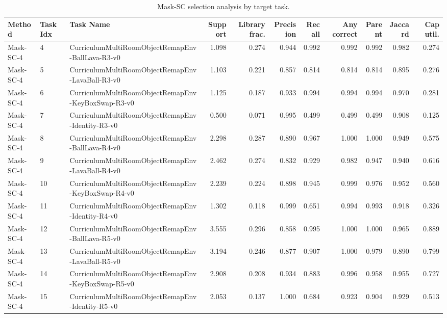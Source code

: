 \begin{table}[ht]
    \caption{Mask-SC selection analysis by target task.}
    \label{tbl:masksc_selection_task}
    \centering
    \scriptsize
    \begin{tabular}{lllrrrrrrrr}
    \toprule
Method & Task Idx & Task Name & Support & Library frac. & Precision & Recall & Any correct & Parent & Jaccard & Cap util. \\
    \midrule
Mask-SC-4 & 4 & CurriculumMultiRoomObjectRemapEnv-BallLava-R3-v0 & 1.098 & 0.274 & 0.944 & 0.992 & 0.992 & 0.992 & 0.982 & 0.274 \\
Mask-SC-4 & 5 & CurriculumMultiRoomObjectRemapEnv-LavaBall-R3-v0 & 1.103 & 0.221 & 0.857 & 0.814 & 0.814 & 0.814 & 0.895 & 0.276 \\
Mask-SC-4 & 6 & CurriculumMultiRoomObjectRemapEnv-KeyBoxSwap-R3-v0 & 1.125 & 0.187 & 0.933 & 0.994 & 0.994 & 0.994 & 0.970 & 0.281 \\
Mask-SC-4 & 7 & CurriculumMultiRoomObjectRemapEnv-Identity-R3-v0 & 0.500 & 0.071 & 0.995 & 0.499 & 0.499 & 0.499 & 0.908 & 0.125 \\
Mask-SC-4 & 8 & CurriculumMultiRoomObjectRemapEnv-BallLava-R4-v0 & 2.298 & 0.287 & 0.890 & 0.967 & 1.000 & 1.000 & 0.949 & 0.575 \\
Mask-SC-4 & 9 & CurriculumMultiRoomObjectRemapEnv-LavaBall-R4-v0 & 2.462 & 0.274 & 0.832 & 0.929 & 0.982 & 0.947 & 0.940 & 0.616 \\
Mask-SC-4 & 10 & CurriculumMultiRoomObjectRemapEnv-KeyBoxSwap-R4-v0 & 2.239 & 0.224 & 0.898 & 0.945 & 0.999 & 0.976 & 0.952 & 0.560 \\
Mask-SC-4 & 11 & CurriculumMultiRoomObjectRemapEnv-Identity-R4-v0 & 1.302 & 0.118 & 0.999 & 0.651 & 0.994 & 0.993 & 0.918 & 0.326 \\
Mask-SC-4 & 12 & CurriculumMultiRoomObjectRemapEnv-BallLava-R5-v0 & 3.555 & 0.296 & 0.858 & 0.995 & 1.000 & 1.000 & 0.965 & 0.889 \\
Mask-SC-4 & 13 & CurriculumMultiRoomObjectRemapEnv-LavaBall-R5-v0 & 3.194 & 0.246 & 0.877 & 0.907 & 1.000 & 0.979 & 0.890 & 0.799 \\
Mask-SC-4 & 14 & CurriculumMultiRoomObjectRemapEnv-KeyBoxSwap-R5-v0 & 2.908 & 0.208 & 0.934 & 0.883 & 0.996 & 0.958 & 0.955 & 0.727 \\
Mask-SC-4 & 15 & CurriculumMultiRoomObjectRemapEnv-Identity-R5-v0 & 2.053 & 0.137 & 1.000 & 0.684 & 0.923 & 0.904 & 0.929 & 0.513 \\
    \bottomrule
    \end{tabular}
\end{table}
